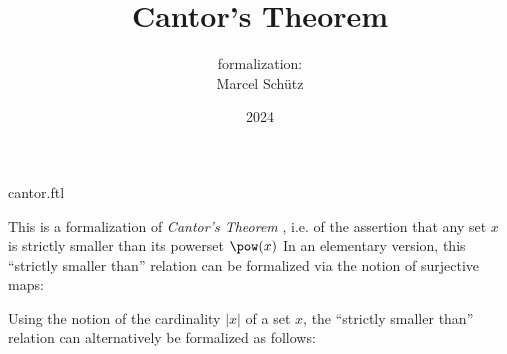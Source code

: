 \documentclass{article}
\title{Cantor's Theorem}
\author{\Naproche formalization: \vspace{0.5em} \\
Marcel Schütz}
\date{2024}
\begin{document}
\begin{smodule}{cantor.ftl}
  \maketitle
  \hidetlsnumbers


  \noindent This is a formalization of \emph{Cantor's Theorem}
  \cite{Cantor1891}, i.e. of the assertion that any set $x$ is strictly smaller
  than its powerset $\pow(x)$
  In an elementary version, this ``strictly smaller than'' relation can be
  formalized via the notion of surjective maps:
  
  \begin{forthel}
  \end{forthel}

  Using the notion of the cardinality $|x|$ of a set $x$, the
  ``strictly smaller than'' relation can alternatively be formalized as follows:

  \begin{forthel}
  \end{forthel}

  \printbibliography
\end{smodule}
\end{document}
